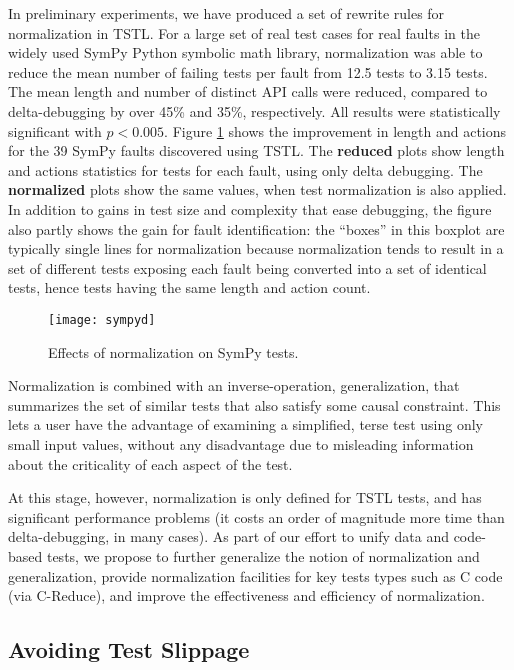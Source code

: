 {In preliminary experiments, we have produced a set of
rewrite rules for normalization in TSTL.  For a large set of real test
cases for real faults in the widely used SymPy Python symbolic math
library, normalization was able to reduce the mean number of failing
tests per fault from 12.5 tests to 3.15 tests.  The mean length and number of
distinct API calls were reduced, compared to delta-debugging by over
45\% and 35\%, respectively.  All results were statistically
significant with $p < 0.005$.  Figure \ref{lengthandactions} shows the
improvement in length and actions for the 39 SymPy faults discovered
using TSTL.  The {\bf reduced} plots show length and actions
statistics for tests for each fault, using only delta debugging.  The
{\bf normalized} plots show the same values, when test normalization
is also applied.  In addition to gains in test size and complexity
that ease debugging, the figure also partly shows the gain for fault
identification:  the ``boxes'' in this boxplot are typically single
lines for normalization because normalization tends to result in a set
of different tests exposing each fault being converted into a set of
identical tests, hence tests having the same length and action count.

\begin{figure}
\texttt{[image: sympyd]}
\caption{Effects of normalization on SymPy tests.}
\label{lengthandactions}
\end{figure}

Normalization is combined with an inverse-operation, generalization,
that summarizes the set of similar tests that also satisfy some causal
constraint.  This lets a user have the advantage of examining a
simplified, terse test using only small input values, without any
disadvantage due to misleading information about the criticality of
each aspect of the test.

At this stage, however, normalization is only defined for TSTL tests,
and has significant performance problems (it costs an order of
magnitude more time than delta-debugging, in many cases).  As part of
our effort to unify data and code-based tests, we propose to further
generalize the notion of normalization and generalization, provide
normalization facilities for key tests types such as C code (via
C-Reduce), and improve the effectiveness and efficiency of normalization.

\subsection{Avoiding Test Slippage}

}
